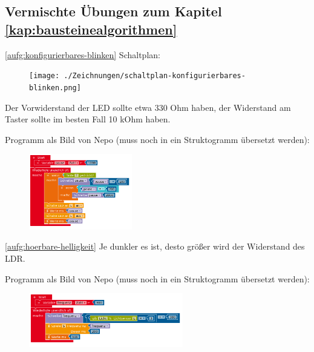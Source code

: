 \subsection{Vermischte Übungen zum Kapitel \ref{kap:bausteinealgorithmen}}
\label{sec:lsg-bausteinealgorithmen}

\begin{loesung}{\ref{aufg:konfigurierbares-blinken}}
	Schaltplan:
	
	\begin{figure}[H]
		\centering
		\texttt{[image: ./Zeichnungen/schaltplan-konfigurierbares-blinken.png]}
	\end{figure}

	Der Vorwiderstand der LED sollte etwa 330 Ohm haben, der Widerstand am Taster sollte im besten Fall 10 kOhm haben.
	
	Programm als Bild von Nepo (muss noch in ein Struktogramm übersetzt werden):
	
	\begin{figure}[H]
		\centering
		\includegraphics[width=0.4\textwidth]{./lsg/prog-konfigurierbares-blinken.png}
	\end{figure}
\end{loesung}

\begin{loesung}{\ref{aufg:hoerbare-helligkeit}}
	Je dunkler es ist, desto größer wird der Widerstand des LDR.
	
	Programm als Bild von Nepo (muss noch in ein Struktogramm übersetzt werden):
	
	\begin{figure}[H]
		\centering
		\includegraphics[width=0.6\textwidth]{./lsg/prog-hoerbare-helligkeit.png}
	\end{figure}
\end{loesung}

